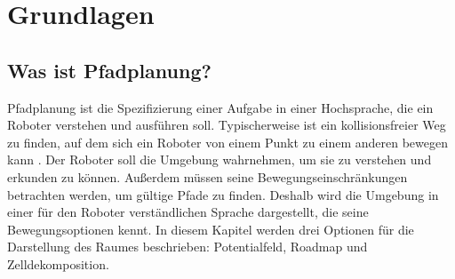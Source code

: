 \chapter{Grundlagen}

\section{Was ist Pfadplanung?}
Pfadplanung ist die Spezifizierung einer Aufgabe in einer Hochsprache, die ein Roboter verstehen und ausführen soll. Typischerweise ist ein kollisionsfreier Weg zu finden, auf dem sich ein Roboter von einem Punkt zu einem anderen bewegen kann \cite[~S. 1]{Principles:05}. Der Roboter soll die Umgebung wahrnehmen, um sie zu verstehen und erkunden zu können. Außerdem müssen seine Bewegungseinschränkungen betrachten werden, um gültige Pfade zu finden. Deshalb wird die Umgebung in einer für den Roboter verständlichen Sprache dargestellt, die seine Bewegungsoptionen kennt. In diesem Kapitel werden drei Optionen für die Darstellung des Raumes beschrieben: Potentialfeld, Roadmap und Zelldekomposition.


